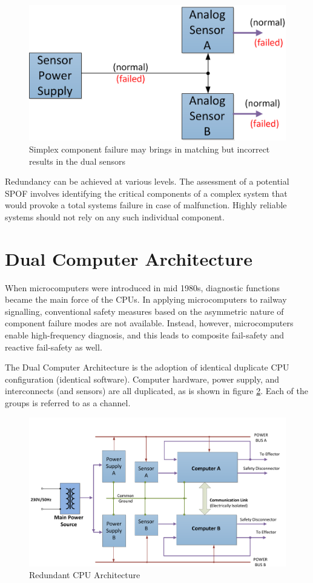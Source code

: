 \documentclass[journal]{IEEEtran}
\begin{document}
  \begin{figure}[!ht] %
    \centering
    \includegraphics[width=0.8\linewidth]{fig_HW006.png}
    \caption{Simplex component failure may brings in matching but incorrect results in the dual 
             sensors}
    \label{HW002:fig006}
  \end{figure}
  
    Redundancy can be achieved at various levels. The assessment of a potential SPOF involves 
    identifying the critical components of a complex system that would provoke a total systems 
    failure in case of malfunction. Highly reliable systems should not rely on any such individual 
    component.

\section{Dual Computer Architecture}
  
  When microcomputers were introduced in mid 1980s, diagnostic functions became the main force of 
  the CPUs. In applying microcomputers to railway signalling, conventional safety measures based on 
  the asymmetric nature of component failure modes are not available. Instead, however, 
  microcomputers enable high-frequency diagnosis, and this leads to composite fail-safety and 
  reactive fail-safety as well. 
  
  The Dual Computer Architecture is the adoption of identical duplicate CPU configuration 
  (identical software).  Computer hardware, power supply, and interconnects (and
  sensors) are all duplicated, as is shown in figure \ref{HW002:fig005}. Each of the groups is 
  referred to as a channel.
  

  \begin{figure}[!ht] %
    \centering
    \includegraphics[width=1\linewidth]{fig_HW005.pdf}
    \caption{Redundant CPU Architecture }
    \label{HW002:fig005}
  \end{figure}
\end{document}
